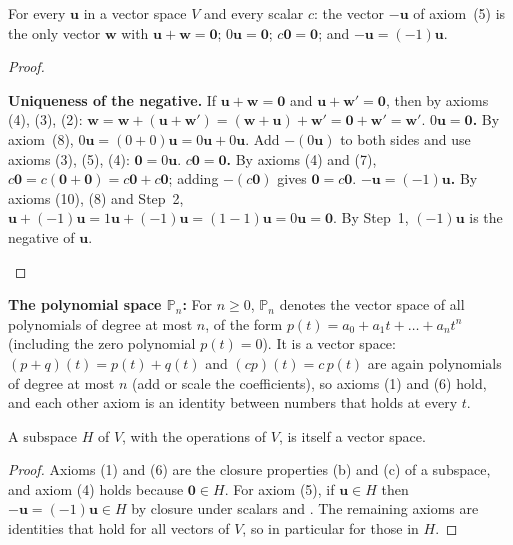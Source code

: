 \documentclass[10pt]{scrartcl}
\newcommand{\vv}[1]{\mathbf{#1}}
\begin{document}
\begin{proposition*}
  For every $\vv u$ in a vector space $V$ and every scalar $c$: the vector $-\vv u$ of axiom~(5) is the only vector $\vv w$ with $\vv u+\vv w=\vv 0$; $0\vv u=\vv 0$; $c\vv 0=\vv 0$; and $-\vv u=(-1)\vv u$.
\end{proposition*}
\begin{proof}
  \begin{steps}
    \ii \textbf{Uniqueness of the negative.} If $\vv u+\vv w=\vv 0$ and $\vv u+\vv w'=\vv 0$, then by axioms (4), (3), (2): $\vv w=\vv w+(\vv u+\vv w')=(\vv w+\vv u)+\vv w'=\vv 0+\vv w'=\vv w'$.
    \ii \textbf{$0\vv u=\vv 0$.} By axiom~(8), $0\vv u=(0+0)\vv u=0\vv u+0\vv u$. Add $-(0\vv u)$ to both sides and use axioms (3), (5), (4): $\vv 0=0\vv u$.
    \ii \textbf{$c\vv 0=\vv 0$.} By axioms (4) and (7), $c\vv 0=c(\vv 0+\vv 0)=c\vv 0+c\vv 0$; adding $-(c\vv 0)$ gives $\vv 0=c\vv 0$.
    \ii \textbf{$-\vv u=(-1)\vv u$.} By axioms (10), (8) and Step~2, $\vv u+(-1)\vv u=1\vv u+(-1)\vv u=(1-1)\vv u=0\vv u=\vv 0$. By Step~1, $(-1)\vv u$ is the negative of $\vv u$.
  \end{steps}
\end{proof}

\begin{itemize}
  \ii \textbf{The polynomial space $\mathbb{P}_n$:} For $n\ge 0$, $\mathbb{P}_n$ denotes the vector space of all polynomials of degree at most $n$, of the form $p(t)=a_0+a_1t+\dots+a_nt^n$ (including the zero polynomial $p(t)=0$). It is a vector space: $(p+q)(t)=p(t)+q(t)$ and $(cp)(t)=c\,p(t)$ are again polynomials of degree at most $n$ (add or scale the coefficients), so axioms (1) and (6) hold, and each other axiom is an identity between numbers that holds at every $t$.
\end{itemize}

\begin{proposition*}
  A subspace $H$ of $V$, with the operations of $V$, is itself a vector space.
\end{proposition*}
\begin{proof}
  Axioms (1) and (6) are the closure properties (b) and (c) of a subspace, and axiom (4) holds because $\vv 0\in H$. For axiom (5), if $\vv u\in H$ then $-\vv u=(-1)\vv u\in H$ by closure under scalars and . The remaining axioms are identities that hold for all vectors of $V$, so in particular for those in $H$.
\end{proof}
\end{document}
